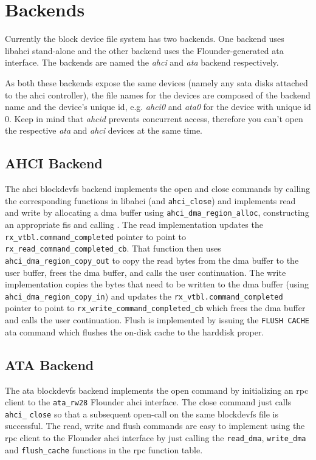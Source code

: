 \section{Backends}

Currently the block device file system has two backends. One backend uses
libahci stand-alone and the other backend uses the Flounder-generated \ac{ata}
interface. The backends are named the \emph{ahci} and \emph{ata} backend
respectively.

As both these backends expose the same devices (namely any \ac{sata} disks
attached to the \ac{ahci} controller), the file names for the devices are
composed of the backend name and the device's unique id, e.g. \emph{ahci0} and
\emph{ata0} for the device with unique id $0$. Keep in mind that \emph{ahcid}
prevents concurrent access, therefore you can't open the respective \emph{ata}
and \emph{ahci} devices at the same time.

\subsection{AHCI Backend}

The \ac{ahci} blockdevfs backend implements the open and close commands by
calling the corresponding functions in libahci (\ahciinit and
\lstinline+ahci_close+) and implements read and write by allocating a \acs{dma}
buffer using \lstinline+ahci_dma_region_alloc+, constructing an appropriate
\ac{fis} and calling \issuecmd. The read implementation updates the
\lstinline+rx_vtbl.command_completed+ pointer to point to
\lstinline+rx_read_command_completed_cb+. That function then uses
\lstinline+ahci_dma_region_copy_out+ to copy the read bytes from the \acs{dma}
buffer to the user buffer, frees the \acs{dma} buffer, and calls the user
continuation. The write implementation copies the bytes that need to be written
to the \acs{dma} buffer (using \lstinline+ahci_dma_region_copy_in+) and updates
the \lstinline+rx_vtbl.command_completed+ pointer to point to
\lstinline+rx_write_command_completed_cb+ which frees the \acs{dma} buffer and
calls the user continuation.  Flush is implemented by issuing the {\tt FLUSH
CACHE} \ac{ata} command which flushes the on-disk cache to the harddisk proper.

\subsection{ATA Backend}

The \ac{ata} blockdevfs backend implements the open command by initializing an
\acs{rpc} client to the \lstinline+ata_rw28+ Flounder \acs{ahci} interface. The
close command just calls \verb+ahci_+ \verb+close+ so that a subsequent open-call
on the same blockdevfs file is successful.  The read, write and flush commands
are easy to implement using the \acs{rpc} client to the Flounder \acs{ahci}
interface by just calling the \lstinline+read_dma+, \lstinline+write_dma+ and
\lstinline+flush_cache+ functions in the \acs{rpc} function table.

